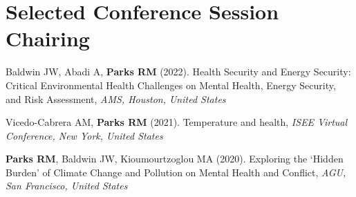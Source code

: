 \section*{Selected Conference Session Chairing}

\noindent Baldwin JW,  Abadi A, \textbf{Parks RM} (2022). Health Security and Energy Security: Critical Environmental Health Challenges on Mental Health, Energy Security, and Risk Assessment, \textit{AMS, Houston, United States} \bigskip

\noindent Vicedo-Cabrera AM, \textbf{Parks RM} (2021). Temperature and health, \textit{ISEE Virtual Conference, New York, United States} \bigskip

\noindent \textbf{Parks RM}, Baldwin JW,  Kioumourtzoglou MA (2020). Exploring the ‘Hidden Burden’ of Climate Change and Pollution on Mental Health and Conflict, \textit{AGU, San Francisco, United States} \bigskip

